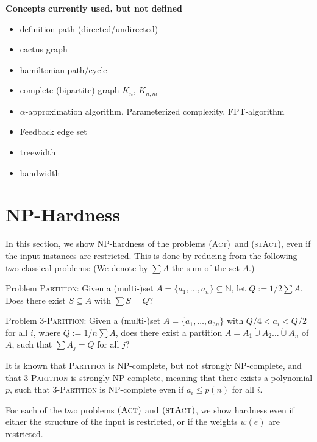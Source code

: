 \documentclass[runningheads]{llncs}
\numberwithin{equation}{section}
\newcommand{\N}{\mathbb{N}}
\newcommand{\set}[1]{\{ #1 \}}
\newcommand{\dotunion}{\mathbin{\dot{\cup}}}
\newcommand{\act}{\textsc{(Act)}}
\newcommand{\stact}{\textsc{(stAct)}}
\begin{document}
\textbf{ Concepts currently used, but not defined }
\begin{itemize}
\item definition path (directed/undirected)
\item cactus graph
\item hamiltonian path/cycle
\item complete (bipartite) graph $K_n$, $K_{n,m}$
\item $\alpha$-approximation algorithm, Parameterized complexity, FPT-algorithm
\item Feedback edge set
\item treewidth
\item bandwidth
\end{itemize}

\section{NP-Hardness}
\label{sec:hardness}

In this section, we show NP-hardness of the problems \act\ and \stact, even if the input instances are restricted. This is done by reducing from the following two classical problems: (We denote by $\sum A$ the sum of the set $A$.)

\vspace*{0.2cm}

Problem \textsc{Partition}: Given a (multi-)set $A = \set{a_1, \ldots, a_n} \subseteq \N$, let $Q := 1/2 \sum A$. Does there exist $S \subseteq A$ with $\sum S = Q$?

\vspace*{0.2cm}

Problem \textsc{3-Partition}: Given a (multi-)set $A = \set{a_1, \ldots, a_{3n}}$ with $Q/4 < a_i < Q/2$ for all $i$, where $Q := 1/n \sum A$, does there exist a partition $A = A_1 \dotunion A_2 \ldots \dotunion A_n$ of $A$, such that $\sum A_j = Q$ for all $j$?

\vspace*{0.2cm}

It is known that \textsc{Partition} is NP-complete, but not strongly NP-complete, and that \textsc{3-Partition} is strongly NP-complete, meaning that there exists a polynomial $p$, such that \textsc{3-Partition} is NP-complete even if $a_i \leq p(n)$ for all $i$.

For each of the two problems $\act$ and $\stact$, we show hardness even if either the structure of the input is restricted, or if the weights $w(e)$ are restricted.
\end{document}

